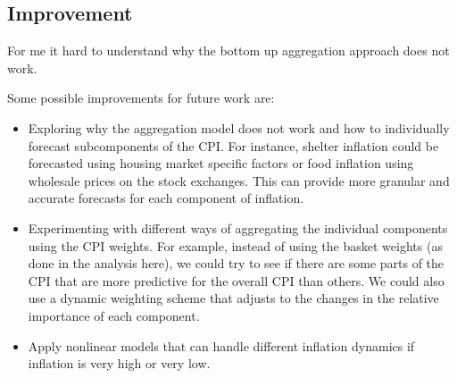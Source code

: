 \documentclass[12pt]{article}
\begin{document}
\subsection{Improvement}
For me it hard to understand why the bottom up aggregation approach does not work. 

Some possible improvements for future work are:
\begin{itemize}
\item Exploring why the aggregation model does not work and how to individually forecast subcomponents of the CPI. For instance, shelter inflation could be forecasted using housing market specific factors or food inflation using wholesale prices on the stock exchanges. This can provide more granular and accurate forecasts for each component of inflation.
\item Experimenting with different ways of aggregating the individual components using the CPI weights. For example, instead of using the basket weights (as done in the analysis here), we could try to see if there are some parts of the CPI that are more predictive for the overall CPI than others. We could also use a dynamic weighting scheme that adjusts to the changes in the relative importance of each component. 
\item Apply nonlinear models that can handle different inflation dynamics if inflation is very high or very low.
\end{itemize}
\end{document}
